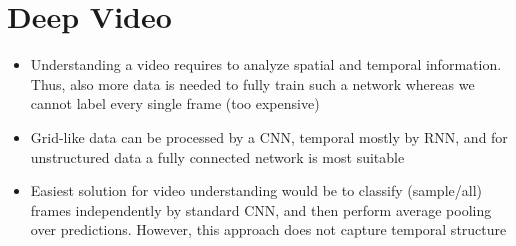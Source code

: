 \section{Deep Video}
\begin{itemize}
	\item Understanding a video requires to analyze spatial and temporal information. Thus, also more data is needed to fully train such a network whereas we cannot label every single frame (too expensive)
	\item Grid-like data can be processed by a CNN, temporal mostly by RNN, and for unstructured data a fully connected network is most suitable
	\item Easiest solution for video understanding would be to classify (sample/all) frames independently by standard CNN, and then perform average pooling over predictions. However, this approach does not capture temporal structure
\end{itemize}
